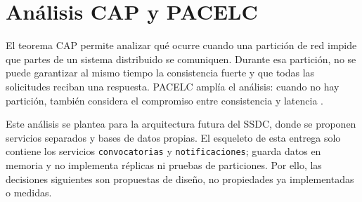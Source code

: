 \section{Análisis CAP y PACELC}

El teorema CAP permite analizar qué ocurre cuando una partición de red impide que partes de un sistema distribuido se comuniquen. Durante esa partición, no se puede garantizar al mismo tiempo la consistencia fuerte y que todas las solicitudes reciban una respuesta. PACELC amplía el análisis: cuando no hay partición, también considera el compromiso entre consistencia y latencia \cite{gilbert2002brewer,abadi2012pacelc}.

Este análisis se plantea para la arquitectura futura del SSDC, donde se proponen servicios separados y bases de datos propias. El esqueleto de esta entrega solo contiene los servicios \texttt{convocatorias} y \texttt{notificaciones}; guarda datos en memoria y no implementa réplicas ni pruebas de particiones. Por ello, las decisiones siguientes son propuestas de diseño, no propiedades ya implementadas o medidas.

